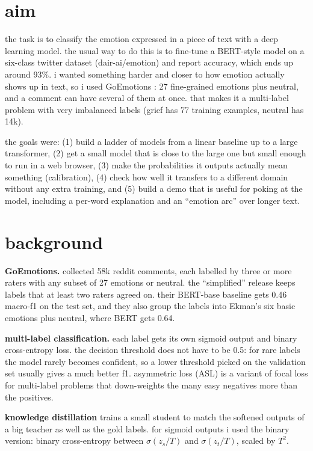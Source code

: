 \section{aim}

the task is to classify the emotion expressed in a piece of text with a deep learning model. the usual way to
do this is to fine-tune a BERT-style model on a six-class twitter dataset (dair-ai/emotion) and report
accuracy, which ends up around 93\%. i wanted something harder and closer to how emotion actually shows up
in text, so i used GoEmotions \cite{goemotions}: 27 fine-grained emotions plus neutral, and a comment can
have several of them at once. that makes it a multi-label problem with very imbalanced labels (grief has 77
training examples, neutral has 14k).

the goals were: (1) build a ladder of models from a linear baseline up to a large transformer, (2) get a
small model that is close to the large one but small enough to run in a web browser, (3) make the
probabilities it outputs actually mean something (calibration), (4) check how well it transfers to a
different domain without any extra training, and (5) build a demo that is useful for poking at the model,
including a per-word explanation and an ``emotion arc'' over longer text.

\section{background}

\textbf{GoEmotions.} \cite{goemotions} collected 58k reddit comments, each labelled by three or more raters
with any subset of 27 emotions or neutral. the ``simplified'' release keeps labels that at least two raters
agreed on. their BERT-base baseline gets 0.46 macro-f1 on the test set, and they also group the labels into
Ekman's six basic emotions \cite{ekman} plus neutral, where BERT gets 0.64.

\textbf{multi-label classification.} each label gets its own sigmoid output and binary cross-entropy loss.
the decision threshold does not have to be 0.5: for rare labels the model rarely becomes confident, so a
lower threshold picked on the validation set usually gives a much better f1. asymmetric loss (ASL)
\cite{asl} is a variant of focal loss for multi-label problems that down-weights the many easy negatives
more than the positives.

\textbf{knowledge distillation} \cite{hinton} trains a small student to match the softened outputs of a big
teacher as well as the gold labels. for sigmoid outputs i used the binary version: binary cross-entropy
between $\sigma(z_s/T)$ and $\sigma(z_t/T)$, scaled by $T^2$.

